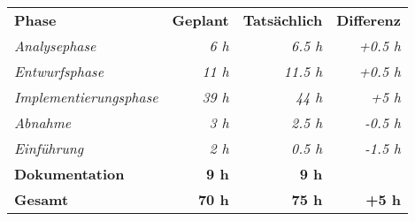 \begin{tabular}{lrrr}
\rowcolor{heading}\textbf{Phase} & \textbf{Geplant}  & \textbf{Tatsächlich}  & \textbf{Differenz}  \\
\rowcolor{heading}\textit{Analysephase} & \textit{6 h} & \textit{6.5 h} & \textit{+0.5 h} \\
\rowcolor{heading}\textit{Entwurfsphase} & \textit{11 h} & \textit{11.5 h} & \textit{+0.5 h} \\
\rowcolor{heading}\textit{Implementierungsphase} & \textit{39 h} & \textit{44 h} & \textit{+5 h} \\
\rowcolor{heading}\textit{Abnahme} & \textit{3 h} & \textit{2.5 h} & \textit{-0.5 h} \\
\rowcolor{heading}\textit{Einführung} & \textit{2 h} & \textit{0.5 h} & \textit{-1.5 h} \\
\rowcolor{heading}\textbf{Dokumentation} & \textbf{9 h} & \textbf{9 h} & \textbf{} \\
\hline
\hline
\rowcolor{heading}\textbf{Gesamt} & \textbf{70 h} & \textbf{75 h} & \textbf{+5 h} \\
\end{tabular}

